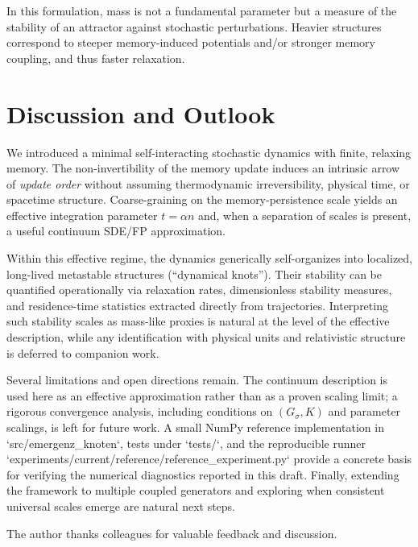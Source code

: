 \documentclass[reprint,amsmath,amssymb,aps,prd,nofootinbib,floatfix]{revtex4-2}
\begin{document}
In this formulation, mass is not a fundamental parameter but a measure of the stability of an attractor against stochastic perturbations.
Heavier structures correspond to steeper memory-induced potentials and/or stronger memory coupling, and thus faster relaxation.

\section{Discussion and Outlook}

We introduced a minimal self-interacting stochastic dynamics with finite, relaxing memory.
The non-invertibility of the memory update induces an intrinsic arrow of \emph{update order} without assuming thermodynamic irreversibility, physical time, or spacetime structure.
Coarse-graining on the memory-persistence scale yields an effective integration parameter $t=\alpha n$ and, when a separation of scales is present, a useful continuum SDE/FP approximation.

Within this effective regime, the dynamics generically self-organizes into localized, long-lived metastable structures (``dynamical knots'').
Their stability can be quantified operationally via relaxation rates, dimensionless stability measures, and residence-time statistics extracted directly from trajectories.
Interpreting such stability scales as mass-like proxies is natural at the level of the effective description, while any identification with physical units and relativistic structure is deferred to companion work.

Several limitations and open directions remain.
The continuum description is used here as an effective approximation rather than as a proven scaling limit; a rigorous convergence analysis, including conditions on $(G_\sigma,K)$ and parameter scalings, is left for future work.
A small NumPy reference implementation in `src/emergenz_knoten`, tests under `tests/`, and the reproducible runner `experiments/current/reference/reference_experiment.py` provide a concrete basis for verifying the numerical diagnostics reported in this draft.
Finally, extending the framework to multiple coupled generators and exploring when consistent universal scales emerge are natural next steps.

\begin{acknowledgments}
The author thanks colleagues for valuable feedback and discussion.
\end{acknowledgments}



\end{document}
